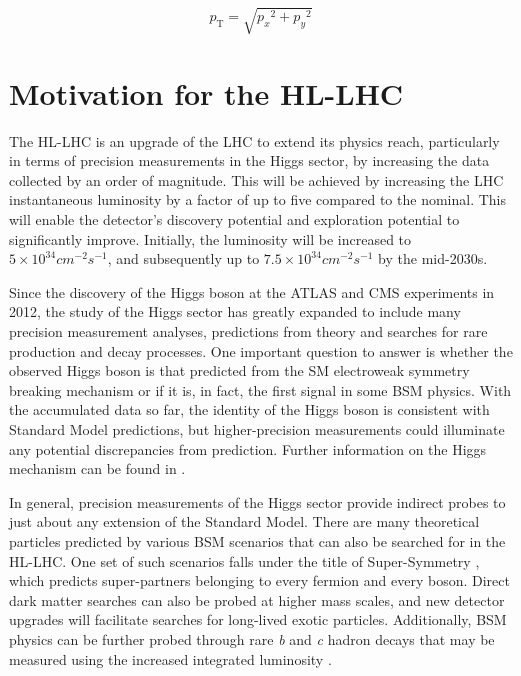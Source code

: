 %
\begin{equation}\label{eq:pt}
  p_\text{T} = \sqrt{ {p_x}^2 + {p_y}^2 }
\end{equation}



\section{Motivation for the HL-LHC}
\label{hi-lumi}


The HL-LHC is an upgrade of the \ac{LHC} to extend its physics reach, particularly in terms of precision measurements in the Higgs sector, by increasing the data collected by an order of magnitude. This will be achieved by increasing the LHC instantaneous luminosity by a factor of up to five compared to the nominal. This will enable the detector's discovery potential and exploration potential to significantly improve. Initially, the luminosity will be increased to $5 \times 10^{34} cm^{−2}s^{−1}$, and subsequently up to $7.5 \times 10^{34} cm^{−2}s^{−1}$ by the mid-2030s.

Since the discovery of the Higgs boson at the ATLAS and CMS experiments \cite{ATLAS-HIGGS, CMS-HIGGS} in 2012, the study of the Higgs sector has greatly expanded to include many precision measurement analyses, predictions from theory and searches for rare production and decay processes. One important question to answer is whether the observed Higgs boson is that predicted from the SM electroweak symmetry breaking mechanism \cite{ewsb} or if it is, in fact, the first signal in some BSM physics. With the accumulated data so far, the identity of the Higgs boson is consistent with Standard Model predictions, but higher-precision measurements could illuminate any potential discrepancies from prediction. Further information on the Higgs mechanism can be found in \cite{Bednyakov_2008}.


In general, precision measurements of the Higgs sector provide indirect probes to just about any extension of the Standard Model. There are many theoretical particles predicted by various BSM scenarios that can also be searched for in the HL-LHC. One set of such scenarios falls under the title of Super-Symmetry \cite{supersym}, which predicts super-partners belonging to every fermion and every boson. Direct dark matter searches can also be probed at higher mass scales, and new detector upgrades will facilitate searches for long-lived exotic particles. Additionally, BSM physics can be further probed through rare \textit{b} and \textit{c} hadron decays that may be measured using the increased integrated luminosity \cite{wg-bsm}.

